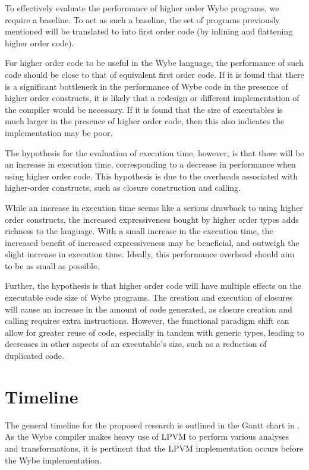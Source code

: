 To effectively evaluate the performance of higher order Wybe programs, we require a baseline. To act as such a baseline, the set of programs previously mentioned will be translated to into first order code (by inlining and flattening higher order code). 

For higher order code to be useful in the Wybe language, the performance of such code should be close to that of equivalent first order code. If it is found that there is a significant bottleneck in the performance of Wybe code in the presence of higher order constructs, it is likely that a redesign or different implementation of the compiler would be necessary. If it is found that the size of executables is much larger in the presence of higher order code, then this also indicates the implementation may be poor.

The hypothesis for the evaluation of execution time, however, is that there will be an increase in execution time, corresponding to a decrease in performance when using higher order code. This hypothesis is due to the overheads associated with higher-order constructs, such as closure construction and calling.

While an increase in execution time seems like a serious drawback to using higher order constructs, the increased expressiveness bought by higher order types adds richness to the language. With a small increase in the execution time, the increased benefit of increased expressiveness may be beneficial, and outweigh the slight increase in execution time. Ideally, this performance overhead should aim to be as small as possible.

Further, the hypothesis is that higher order code will have multiple effects on the executable code size of Wybe programs. The creation and execution of closures will cause an increase in the amount of code generated, as closure creation and calling requires extra instructions. However, the functional paradigm shift can allow for greater reuse of code, especially in tandem with generic types, leading to decreases in other aspects of an executable's size, such as a reduction of duplicated code.

\section{Timeline}

The general timeline for the proposed research is outlined in the Gantt chart in . As the Wybe compiler makes heavy use of LPVM to perform various analyses and transformations, it is pertinent that the LPVM implementation occurs before the Wybe implementation.

